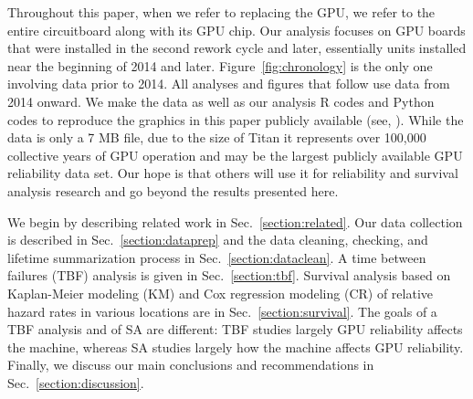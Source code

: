 Throughout this paper, when we refer to replacing the GPU, we refer to
the entire circuitboard along with its GPU chip. Our analysis focuses
on GPU boards that were installed in the second rework cycle and
later, essentially units installed near the beginning of 2014 and
later. Figure~\ref{fig:chronology} is the only one involving data
prior to 2014. All analyses and figures that follow use data from 2014
onward. We make the data as well as our analysis R codes and Python
codes to reproduce the graphics in this paper publicly available (see,
\cite[repository to be added in final
version]{repositoryreference,rcodes,pycodes}).  While the data is only
a 7 MB file, due to the size of Titan it represents over 100,000
collective years of GPU operation and may be the largest publicly
available GPU reliability data set. Our hope is that others will use
it for reliability and survival analysis research and go beyond the
results presented here.

We begin by describing related work in Sec.~\ref{section:related}. Our
data collection is described in Sec.~\ref{section:dataprep} and the
data cleaning, checking, and lifetime summarization process in
Sec.~\ref{section:dataclean}. A time between failures (TBF) analysis
is given in Sec.~\ref{section:tbf}. Survival analysis  based on
Kaplan-Meier modeling (KM) and Cox regression modeling (CR) of
relative hazard rates in various locations are in
Sec.~\ref{section:survival}. The goals of a TBF analysis and of
SA are different: TBF studies largely  GPU
reliability affects the machine, whereas SA studies largely how the
machine affects GPU reliability.  Finally, we discuss our main
conclusions and recommendations in Sec.~\ref{section:discussion}.
 


